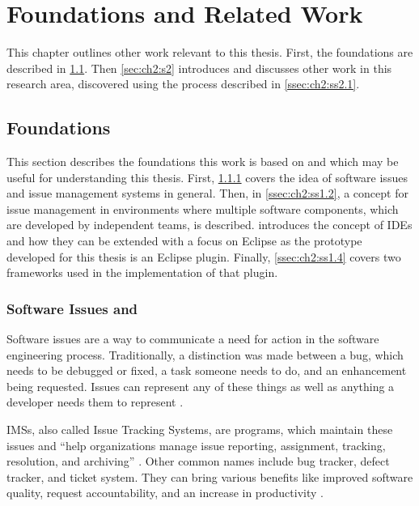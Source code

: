 
\chapter{Foundations and Related Work}
\label{chap:ch2}
This chapter outlines other work relevant to this thesis.
First, the foundations are described in \cref{sec:ch2:s1}.
Then \cref{sec:ch2:s2} introduces and discusses other work in this research area, 
discovered using the process described in \cref{ssec:ch2:ss2.1}.

\section{Foundations}
\label{sec:ch2:s1}
This section describes the foundations this work is based on and which may be useful for understanding this thesis.
First, \cref{ssec:ch2:ss1.1} covers the idea of software issues and issue management systems in general.
Then, in \cref{ssec:ch2:ss1.2}, a concept for issue management in environments where multiple software components, 
which are developed by independent teams, is described.
 introduces the concept of \glspl{IDE} and how they can be extended 
with a focus on \gls{Eclipse} as the prototype developed for this thesis is an \gls{Eclipse} plugin.
Finally, \cref{ssec:ch2:ss1.4} covers two frameworks used in the implementation of that plugin.

\subsection{Software Issues and }
\label{ssec:ch2:ss1.1}
Software issues are a way to communicate a need for action in the software engineering process.
Traditionally, a distinction was made between a bug, which needs to be debugged or fixed, a task someone needs to do, 
and an enhancement being requested.
Issues can represent any of these things as well as anything a developer needs them to represent \cite{Atlassian2020Issue,Github2020Issues}.

\glspl{IMS}, also called Issue Tracking Systems, are programs, which maintain these issues 
and ``help organizations manage issue reporting, assignment, tracking, resolution, and archiving'' \cite{bertram2010communication}.
Other common names include bug tracker, defect tracker, and ticket system.
They can bring various benefits like improved software quality, request accountability, and 
an increase in productivity \cite{janak2009issue}. 

